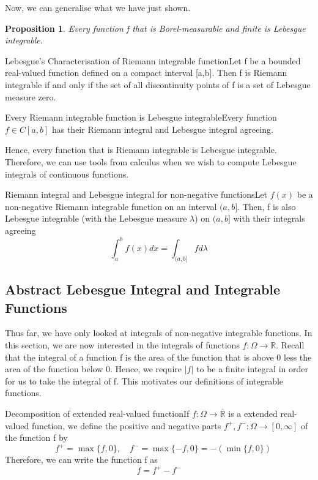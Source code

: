 \documentclass[twoside]{article}
\newtheorem{proposition}[theorem]{Proposition}
\begin{document}
Now, we can generalise what we have just shown.

\begin{proposition}Every function f that is Borel-measurable and finite is Lebesgue integrable.
\end{proposition}

\begin{theorem_exam}{Lebesgue's Characterisation of Riemann integrable function}{}Let f be a bounded real-valued function defined on a compact interval [a,b]. Then f is Riemann integrable if and only if the set of all discontinuity points of f is a set of Lebesgue measure zero.
\end{theorem_exam}

\begin{theorem_exam}{Every Riemann integrable function is Lebesgue integrable}{}Every function $f \in C[a,b]$ has their Riemann integral and Lebesgue integral agreeing.
\end{theorem_exam}

Hence, every function that is Riemann integrable is Lebesgue integrable. Therefore, we can use tools from calculus when we wish to compute Lebesgue integrals of continuous functions.
 

\begin{proposition_exam}{Riemann integral and Lebesgue integral for non-negative functions}{}Let $f(x)$ be a non-negative Riemann integrable function on an interval $(a,b].$ Then, f is also Lebesgue integrable (with the Lebesgue measure $\lambda$) on $(a,b]$ with their integrals agreeing 
$$
\int_{a}^{b}f(x)dx = \int_{(a,b]}fd\lambda
$$
\end{proposition_exam}

\subsection{Abstract Lebesgue Integral and Integrable Functions}

Thus far, we have only looked at integrals of non-negative integrable functions. In this section, we are now interested in the integrals of functions $f:\Omega \rightarrow \mathbb{R}.$ Recall that the integral of a function f is the area of the function that is above 0 less the area of the function below 0. Hence, we require $|f|$ to be a finite integral in order for us to take the integral of f. This motivates our definitions of integrable functions. 

\begin{definition_exam}{Decomposition of extended real-valued function}{}If $f: \Omega \rightarrow \overline{\mathbb{R}}$ is a extended real-valued function, we define the positive and negative parts $f^+, f^-: \Omega \rightarrow [0, \infty]$ of the function f by 
$$
\quad f^+=\max \{f, 0\}, \quad f^-=\max \{-f, 0\} = -(\min \{f, 0\})
$$
Therefore, we can write the function f as 
$$
f = f^+ - f^-
$$
\end{definition_exam}
\end{document}
